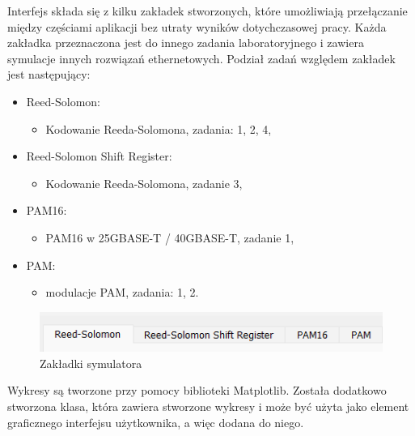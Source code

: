 Interfejs składa się z kilku zakładek stworzonych, które umożliwiają przełączanie między częściami aplikacji bez utraty wyników dotychczasowej pracy. Każda zakładka przeznaczona jest do innego zadania laboratoryjnego i zawiera symulacje innych rozwiązań ethernetowych. Podział zadań względem zakładek jest następujący:
\begin{itemize}
    \item Reed-Solomon:
    \begin{itemize}
        \item Kodowanie Reeda-Solomona, zadania: 1, 2, 4,
    \end{itemize}
    \item Reed-Solomon Shift Register:
    \begin{itemize}
        \item Kodowanie Reeda-Solomona, zadanie 3,
    \end{itemize}
    \item PAM16:
    \begin{itemize}
        \item PAM16 w 25GBASE-T / 40GBASE-T, zadanie 1,
    \end{itemize}
    \item PAM:
    \begin{itemize}
        \item modulacje PAM, zadania: 1, 2.
    \end{itemize}
\end{itemize}

\begin{figure}[ht]
    \centering
    \includegraphics{images/zakladki.png}
    \caption{Zakładki symulatora}
    \label{fig:zakladki_image}
\end{figure}

Wykresy są tworzone przy pomocy biblioteki Matplotlib. Została dodatkowo stworzona klasa, która zawiera stworzone wykresy i może być użyta jako element graficznego interfejsu użytkownika, a więc dodana do niego.

